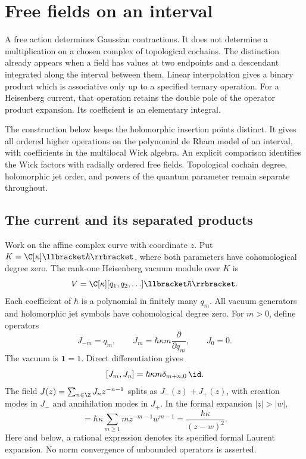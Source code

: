 \chapter{Free fields on an interval}
\label{chap:free-field-interval}

A free action determines Gaussian contractions.  It does not determine a
multiplication on a chosen complex of topological cochains.  The distinction
already appears when a field has values at two endpoints and a descendant
integrated along the interval between them.  Linear interpolation gives a
binary product which is associative only up to a specified ternary operation.
For a Heisenberg current, that operation retains the double pole of the
operator product expansion.  Its coefficient is an elementary integral.

The construction below keeps the holomorphic insertion points distinct.
It gives all ordered higher operations on the polynomial de Rham model of
an interval, with coefficients in the multilocal Wick algebra.  An explicit
comparison identifies the Wick factors with radially ordered free fields.
Topological cochain degree, holomorphic jet order, and powers of the quantum
parameter remain separate throughout.

\section{The current and its separated products}

Work on the affine complex curve with coordinate $z$.  Put
$K=\C[\kappa]\llbracket\hbar\rrbracket$, where both parameters have
cohomological degree zero.  The rank-one Heisenberg vacuum module over $K$ is
\[
 V=\C[\kappa][q_1,q_2,\ldots]\llbracket\hbar\rrbracket.
\]
Each coefficient of $\hbar$ is a polynomial in finitely many $q_m$.
All vacuum generators and holomorphic jet symbols have cohomological degree zero.
For $m>0$, define operators
\[
 J_{-m}=q_m,\qquad
 J_m=\hbar\kappa m\frac{\partial}{\partial q_m},\qquad J_0=0.
\]
The vacuum is $\mathbf1=1$.  Direct differentiation gives
\[
 [J_m,J_n]=\hbar\kappa m\delta_{m+n,0}\,\id.
\]
The field $J(z)=\sum_{n\in\Z}J_nz^{-n-1}$ splits as
$J_-(z)+J_+(z)$, with creation modes in $J_-$ and annihilation modes
in $J_+$.  In the formal expansion $|z|>|w|$,
\begin{equation*}
 [J_+(z),J_-(w)]
 =\hbar\kappa\sum_{m\ge1}m z^{-m-1}w^{m-1}
 =\frac{\hbar\kappa}{(z-w)^2}.
\end{equation*}
Here and below, a rational expression denotes its specified formal Laurent
expansion.  No norm convergence of unbounded operators is asserted.

